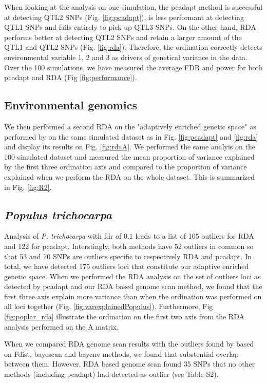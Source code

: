 \documentclass[a4paper,times,10pt,authoryear]{article}%
\begin{document}
When looking at the analysis on one simulation, the pcadapt method is successful at detecting QTL2 SNPs (Fig. \ref{fig:pcadapt}), is less performant at detecting QTL1 SNPs and fails entirely to pick-up QTL3 SNPs. On the other hand, RDA performs better at detecting QTL2 SNPs and retain a larger amount of the QTL1 and QTL2 SNPs (Fig. \ref{fig:rda}). Therefore, the ordination correctly detects environmental variable 1, 2 and 3 as drivers of genetical variance in the data. Over the 100 simulations, we have measured the average FDR and power for both pcadapt and RDA (Fig \ref{fig:performance}). 


\subsection{Environmental genomics}

We then performed a second RDA on the "adaptively enriched genetic space" as performed by \citet{Steane2014a} on the same simulated dataset as in Fig. \ref{fig:pcadapt} and \ref{fig:rda} and display its results on Fig. \ref{fig:rdaA}. We performed the same analyis on the 100 simulated dataset and measured the mean proportion of variance explained by the first three ordination axis and compared to the proportion of variance explained when we perform the RDA on the whole dataset. This is summarized in Fig. \ref{fig:R2}.



\subsection{\textit{Populus trichocarpa}}

Analysis of \textit{P. trichocarpa} with fdr of $0.1$ leads to a list of 105 outliers for RDA and 122 for pcadapt. Interstingly, both methods have 52 outliers in common so that 53 and 70 SNPs are outliers specific to respectively RDA and pcadapt. In total, we have detected 175 outliers loci that constitute our adaptive enriched genetic space.
When we performed the RDA analysis on the set of outliers loci as detected by pcadapt and our RDA based genome scan method, we found that the first three axis explain more variance than when the ordination was performed on all loci together (Fig. \ref{fig:varexplainedPopulus}). Furthermore, Fig \ref{fig:poplar_rda} illustrate the ordination on the first two axis from the RDA analysis performed on the A matrix.

When we compared RDA genome scan results with the outliers found by \citet{Geraldes2014} based on Fdist, bayescan and bayenv methods, we found that substential overlap between them. However, RDA based genome scan found 35 SNPs that no other methods (including pcadapt) had detected as outlier (see Table S2). 
\end{document}
